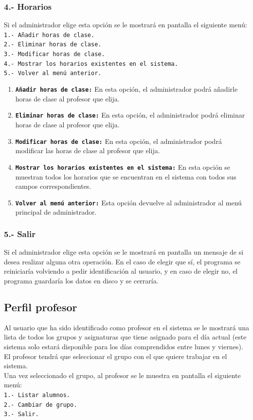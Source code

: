 \documentclass{book}
\begin{document}
\subsubsection{4.- Horarios}{
Si el administrador elige esta opción se le mostrará en pantalla el siguiente menú:\\
\texttt{1.- Añadir horas de clase.}\\
\texttt{2.- Eliminar horas de clase.}\\
\texttt{3.- Modificar horas de clase.}\\
\texttt{4.- Mostrar los horarios existentes en el sistema.}\\
\texttt{5.- Volver al menú anterior.}
\begin{enumerate}
	\item \textbf{\texttt{Añadir horas de clase:}} En esta opción, el administrador podrá añadirle horas de clase al profesor que elija.
	\item \textbf{\texttt{Eliminar horas de clase:}} En esta opción, el administrador podrá eliminar horas de clase al profesor que elija.
	\item \textbf{\texttt{Modificar horas de clase:}} En esta opción, el administrador podrá modificar las horas de clase al profesor que elija.
	\item \textbf{\texttt{Mostrar los horarios existentes en el sistema:}} En esta opción se muestran todos los horarios que se encuentran en el sistema con todos sus campos correspondientes.
	\item \textbf{\texttt{Volver al menú anterior:}} Esta opción devuelve al administrador al menú principal de administrador.
\end{enumerate}
}
\subsubsection{5.- Salir}{
Si el administrador elige esta opción se le mostrará en pantalla un mensaje de si desea realizar alguna otra operación. En el caso de elegir que sí, el programa se reiniciaría volviendo a pedir identificación al usuario, y en caso de elegir no, el programa guardaría los datos en disco y se cerraría.
}


\subsection{Perfil profesor}{
Al usuario que ha sido identificado como profesor en el sistema se le mostrará una lista de todos los grupos y asignaturas que tiene asignado para el día actual (este sistema solo estará disponible para los días comprendidos entre lunes y viernes). El profesor tendrá que seleccionar el grupo con el que quiere trabajar en el sistema.\\
Una vez seleccionado el grupo, al profesor se le muestra en pantalla el siguiente menú:\\
\texttt{1.- Listar alumnos.}\\
\texttt{2.- Cambiar de grupo.}\\
\texttt{3.- Salir.}
}
\end{document}
